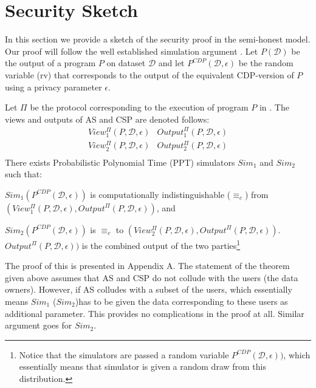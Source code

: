 \section{\system Security Sketch}



In this section we provide a sketch of the security proof in the semi-honest model.
Our proof will follow the well established simulation argument \cite{Oded}. Let
$P(\mathcal{D})$ be the output of a program $P$ on dataset 
$\mathcal{D}$ and let $P^{CDP}(\mathcal{D},\epsilon)$ be the random
variable (rv) that corresponds to the output of the equivalent
\textsf{CDP}-version of $P$ using a privacy parameter $\epsilon$.

\begin{theorem}\label{thm:security}
\rm
Let $\Pi$ be the protocol corresponding to the execution of program $P$ in \system. The
views and outputs of \textsf{AS} and \textsf{CSP} are denoted follows:
\[
\begin{array}{cc}
View_1^{\Pi}(P,\mathcal{D},\epsilon) & Output_1^{\Pi}(P,\mathcal{D},\epsilon) \\
View_2^{\Pi}(P,\mathcal{D},\epsilon) & Output_2^{\Pi}(P,\mathcal{D},\epsilon) \\
\end{array}
\]
There exists Probabilistic Polynomial Time (PPT) simulators $Sim_1$
and $Sim_2$ such that:
\squishlist
\item $Sim_1 (P^{CDP}(\mathcal{D},\epsilon))$ is computationally indistinguishable ($\equiv_c$)
from $(View_1^{\Pi}(P,\mathcal{D},\epsilon),Output^{\Pi}(P,\mathcal{D},\epsilon))$, and
\item $Sim_2 (P^{CDP}(\mathcal{D},\epsilon))$ is $\equiv_c$
to $(View_2^{\Pi}(P,\mathcal{D},\epsilon),Output^{\Pi}(P,\mathcal{D},\epsilon))$.
\squishend
$Output^{\Pi}(P,\mathcal{D},\epsilon))$ is the combined output of the two
parties\footnote{Notice that the simulators are passed a random variable $P^{CDP}(\mathcal{D},\epsilon))$,
which essentially means that simulator is given a random draw from this distribution.}
\end{theorem}
The proof of this is presented in Appendix A. The statement of the theorem given above assumes
that \textsf{AS} and \textsf{CSP} do not collude with the users (the
data owners). However, if \textsf{AS} colludes with a subset of the
users, which essentially means $Sim_1$ ($Sim_2$)has to be given the data
corresponding to these users as additional parameter. This provides no
complications in the proof at all.   Similar argument goes for $Sim_2$. 


